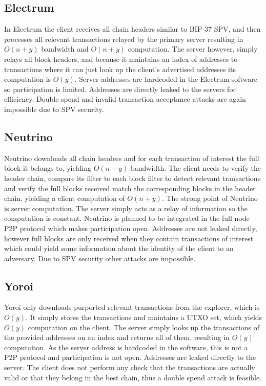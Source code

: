 \subsection{Electrum}
In Electrum the client receives all chain headers similar to BIP-37 SPV, and then processes all relevant transactions relayed by the primary server resulting in $O(n+y)$ bandwidth and $O(n+y)$ computation. The server however, simply relays all block headers, and because it maintains an index of addresses to transactions where it can just look up the client's advertised addresses its computation is $O(y)$. Server addresses are hardcoded in the Electrum software so participation is limited. Addresses are directly leaked to the servers for efficiency. Double spend and invalid transaction acceptance attacks are again impossible due to SPV security.

\subsection{Neutrino}
Neutrino downloads all chain headers and for each transaction of interest the full block it belongs to, yielding $O(n+y)$ bandwidth. The client needs to verify the header chain, compare its filter to each block filter to detect relevant transactions and verify the full blocks received match the corresponding blocks in the header chain, yielding a client computation of $O(n+y)$. The strong point of Neutrino is server computation. The server simply acts as a relay of information so the computation is constant. Neutrino is planned to be integrated in the full node P2P protocol which makes participation open. Addresses are not leaked directly, however full blocks are only received when they contain transactions of interest which could yield some information about the identity of the client to an adversary. Due to SPV security other attacks are impossible.

\subsection{Yoroi}
Yoroi only downloads purported relevant transactions from the explorer, which is $O(y)$. It simply stores the transactions and maintains a UTXO set, which yields $O(y)$ computation on the client. The server simply looks up the transactions of the provided addresses on an index and returns all of them, resulting in $O(y)$ computation. As the server address is hardcoded in the software, this is not a P2P protocol and participation is not open. Addresses are leaked directly to the server. The client does not perform any check that the transactions are actually valid or that they belong in the best chain, thus a double spend attack is feasible.
